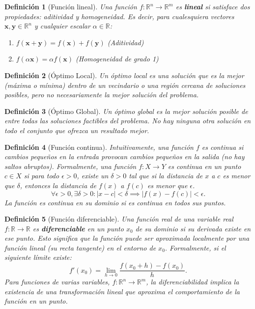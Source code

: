 \documentclass[12pt,a4paper]{book}
\newtheorem{defi}{Definición}[section]
\begin{document}
\begin{defi}[Función lineal]
\label{def:f_lineal}
Una función $f: \mathbb{R}^n \to \mathbb{R}^m$ es \textbf{lineal} si satisface dos propiedades: aditividad y homogeneidad. Es decir, para cualesquiera vectores $\mathbf{x}, \mathbf{y} \in \mathbb{R}^n$ y cualquier escalar $\alpha \in \mathbb{R}$:
\begin{enumerate}
    \item $f(\mathbf{x}+\mathbf{y}) = f(\mathbf{x}) + f(\mathbf{y})$ (Aditividad)
    \item $f(\alpha \mathbf{x}) = \alpha f(\mathbf{x})$ (Homogeneidad de grado 1)
\end{enumerate}
\end{defi}

\begin{defi}[Óptimo Local]
\label{def:optimo_local}
Un óptimo local es una solución que es la mejor (máxima o mínima) dentro de un vecindario o una región cercana de soluciones posibles,
pero no necesariamente la mejor solución del problema.
\end{defi}

\begin{defi}[Óptimo Global]
\label{def:optimo_global}
Un óptimo global es la mejor solución posible de entre todas las soluciones factibles del problema.
No hay ninguna otra solución en todo el conjunto que ofrezca un resultado mejor.

\end{defi}


\begin{defi}[Función continua]
\label{def:fun_continua}
Intuitivamente, una función $f$ es continua si cambios pequeños en la entrada provocan cambios pequeños en la salida (no hay saltos abruptos). Formalmente, una función $f: X \to Y$ es continua en un punto $c \in X$ si para todo $\epsilon > 0$, existe un $\delta > 0$ tal que si la distancia de $x$ a $c$ es menor que $\delta$, entonces la distancia de $f(x)$ a $f(c)$ es menor que $\epsilon$.
$$ \forall \epsilon > 0, \exists \delta > 0 : |x-c| < \delta \implies |f(x)-f(c)| < \epsilon .$$
La función es continua en su dominio si es continua en todos sus puntos.
\end{defi}

\begin{defi}[Función diferenciable]
    \label{def:fun_diferenciable}
Una función real de una variable real $f: \mathbb{R} \to \mathbb{R}$ es \textbf{diferenciable} en un punto $x_0$ de su dominio si su derivada existe en ese punto. Esto significa que la función puede ser aproximada localmente por una función lineal (su recta tangente) en el entorno de $x_0$. Formalmente, si el siguiente límite existe:
$$ f'(x_0) = \lim_{h \to 0} \frac{f(x_0+h) - f(x_0)}{h} .$$
Para funciones de varias variables, $f: \mathbb{R}^n \to \mathbb{R}^m$, la diferenciabilidad implica la existencia de una transformación lineal  que aproxima el comportamiento de la función en un punto.
\end{defi}
\end{document}
